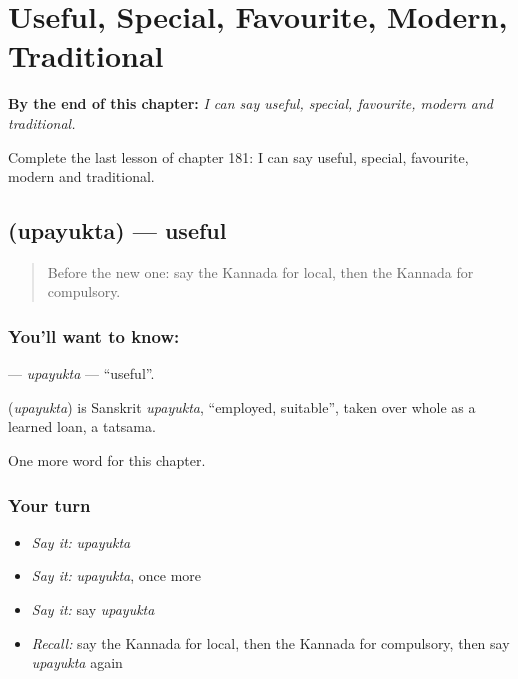 
\chapter{Useful, Special, Favourite, Modern, Traditional}
\label{ch:ka-useful-special-favourite-modern-traditional}

\begin{chapteropening}
\textbf{By the end of this chapter:} \emph{I can say useful, special, favourite, modern and traditional.}

Complete the last lesson of chapter 181: I can say useful, special, favourite, modern and traditional.
\end{chapteropening}

\section[\texorpdfstring{\kn{ಉಪಯುಕ್ತ} (upayukta)}{ಉಪಯುಕ್ತ (upayukta)}]{ (upayukta) — useful}

\label{lesson:KA-C181-upayukta}



\begin{quote}
Before the new one: say the Kannada for local, then the Kannada for compulsory.
\end{quote}

\subsection*{You'll want to know: }
\textbf{} — \emph{upayukta} — \textquotedblleft{}useful\textquotedblright{}.

\begin{cousinweb}
\textbf{} (\emph{upayukta}) is Sanskrit \emph{upayukta}, \textquotedblleft{}employed, suitable\textquotedblright{}, taken over whole as a learned loan, a tatsama.
\end{cousinweb}

\begin{grammarlens}[title={What you've built}]
One more word for this chapter.
\end{grammarlens}

\subsection*{Your turn}
\begin{itemize}
\raggedright
  \item \emph{Say it:} \emph{upayukta}
  \item \emph{Say it:} \emph{upayukta}, once more
  \item \emph{Say it:} say \emph{upayukta}
  \item \emph{Recall:} say the Kannada for local, then the Kannada for compulsory, then say \emph{upayukta} again
\end{itemize}

